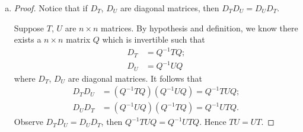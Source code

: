 \begin{Exercise}
	\begin{enumerate}[(a)]
		\item
		\begin{proof}
			Notice that if $D_T$, $D_U$ are diagonal matrices, then $D_T D_U = D_U D_T$.
			
			Suppose $T$, $U$ are $n\times n$ matrices. By hypothesis and definition, we know there exists a $n\times n$ matrix $Q$ which is invertible such that
			\begin{align*}
			D_T &= Q^{-1} T Q; \\
			D_U &= Q^{-1} U Q
			\end{align*}
			where $D_T$, $D_U$ are diagonal matrices. It follows that 
			\begin{align*}
			D_T D_U &= (Q^{-1} T Q) (Q^{-1} U Q) = Q^{-1} T U Q; \\
			D_U D_T &= (Q^{-1} U Q) (Q^{-1} T Q) = Q^{-1} U T Q.
			\end{align*}
			Observe $D_T D_U = D_U D_T$, then $Q^{-1} T U Q = Q^{-1} U T Q$. Hence $T U = U T$.
		\end{proof}
	\end{enumerate}
\end{Exercise}